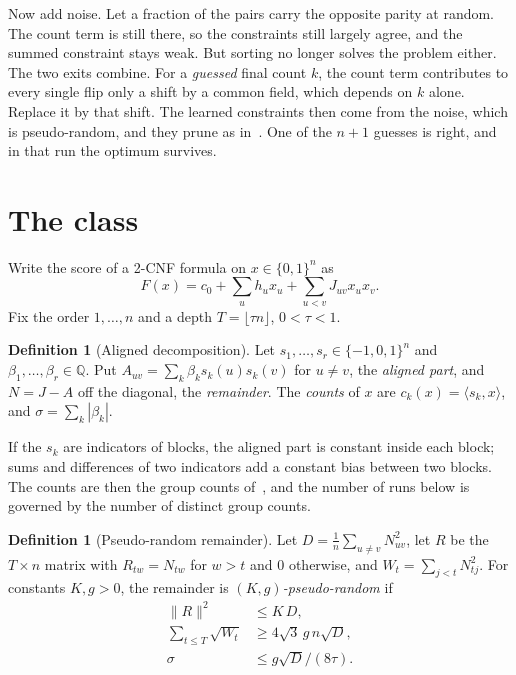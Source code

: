 \documentclass[11pt,a4paper]{article}
\theoremstyle{definition}
\newtheorem{definition}[theorem]{Definition}
\theoremstyle{remark}
\begin{document}
Now add noise. Let a fraction of the pairs carry the opposite parity at random.
The count term is still there, so the constraints still largely agree, and the
summed constraint stays weak. But sorting no longer solves the problem either.
The two exits combine. For a \emph{guessed} final count $k$, the count term
contributes to every single flip only a shift by a common field, which depends
on $k$ alone. Replace it by that shift. The learned constraints then come from
the noise, which is pseudo-random, and they prune as in~\cite{CC}. One of the
$n+1$ guesses is right, and in that run the optimum survives.

\section{The class}\label{sec:class}

Write the score of a 2-CNF formula on $x\in\{0,1\}^n$ as
\[
 F(x)=c_0+\sum_uh_ux_u+\sum_{u<v}J_{uv}x_ux_v .
\]
Fix the order $1,\dots,n$ and a depth $T=\lfloor\tau n\rfloor$, $0<\tau<1$.

\begin{definition}[Aligned decomposition]
Let $s_1,\dots,s_r\in\{-1,0,1\}^n$ and $\beta_1,\dots,\beta_r\in\mathbb Q$.
Put $A_{uv}=\sum_k\beta_ks_k(u)s_k(v)$ for $u\ne v$, the \emph{aligned part},
and $N=J-A$ off the diagonal, the \emph{remainder}. The \emph{counts} of $x$
are $c_k(x)=\langle s_k,x\rangle$, and $\sigma=\sum_k|\beta_k|$.
\end{definition}

If the $s_k$ are indicators of blocks, the aligned part is constant inside each
block; sums and differences of two indicators add a constant bias between two
blocks. The counts are then the group counts of~\cite{RG}, and the number of
runs below is governed by the number of distinct group counts.

\begin{definition}[Pseudo-random remainder]\label{def:prr}
Let $D=\frac1n\sum_{u\ne v}N_{uv}^2$, let $R$ be the $T\times n$ matrix with
$R_{tw}=N_{tw}$ for $w>t$ and $0$ otherwise, and $W_t=\sum_{j<t}N_{tj}^2$.
For constants $K,g>0$, the remainder is \emph{$(K,g)$-pseudo-random} if
\begin{align}
 \|R\|^2&\le K\,D,\tag{R1}\label{R1}\\
 \sum_{t\le T}\sqrt{W_t}&\ge4\sqrt3\,g\,n\sqrt D,\tag{R2}\label{R2}\\
 \sigma&\le g\sqrt D/(8\tau).\tag{R3}\label{R3}
\end{align}
\end{definition}
\end{document}
